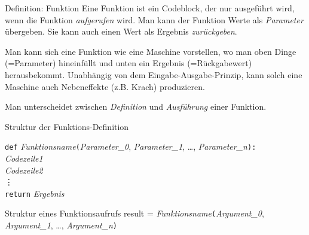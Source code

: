 \begin{frame}
\begin{block}{Definition: Funktion}
\vspace{2pt}
Eine Funktion ist ein Codeblock, der nur ausgeführt wird, wenn die Funktion \emph{aufgerufen} wird. 
Man kann der Funktion Werte als \emph{Parameter} übergeben. 
Sie kann auch einen Wert als Ergebnis \emph{zurückgeben}. 
\end{block}

\pause 

\vspace{12pt}
Man kann sich eine Funktion wie eine Maschine vorstellen, wo man oben Dinge (=Parameter) hineinfüllt und unten ein Ergebnis (=Rückgabewert) herausbekommt. 
Unabhängig von dem Eingabe-Ausgabe-Prinzip, kann solch eine Maschine auch Nebeneffekte (z.B. Krach) produzieren. 

\pause 

\vspace{12pt}
Man unterscheidet zwischen \emph{Definition} und \emph{Ausführung} einer Funktion. 
\end{frame}



\begin{frame}


\renewcommand{\baselinestretch}{1.5}
\begin{block}{Struktur der Funktions-Definition}	
\vspace{2pt}

\pause 

\texttt{def} \pause \textit{Funktionsname}\pause\texttt{(}\pause\textit{Parameter\_0}\pause, \textit{Parameter\_1}, \dots, \textit{Parameter\_n}\pause\texttt{)}\pause\texttt{:}\\
\pause \spacechar \spacechar \textit{Codezeile1} \\
\pause \spacechar \spacechar \textit{Codezeile2} \\
\pause \phantom{Code} \vdots \\
\pause \spacechar \spacechar \texttt{return} \textit{Ergebnis}
\end{block}
\renewcommand{\baselinestretch}{1}
\vspace{12pt}

\pause 

\begin{block}{Struktur eines Funktionsaufrufs}	
\vspace{2pt}
result = \textit{Funktionsname}\texttt{(}\textit{Argument\_0}, \textit{Argument\_1}, \dots, \textit{Argument\_n}\texttt{)}
\end{block}

\end{frame}



